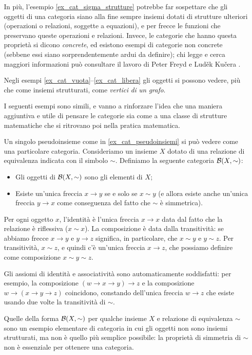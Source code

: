 In più, l'esempio \ref{ex_cat_sigma_strutture} potrebbe far sospettare che gli oggetti di una categoria siano alla fine sempre insiemi dotati di strutture ulteriori (operazioni o relazioni, soggette a equazioni), e per frecce le funzioni che preservano queste operazioni e relazioni. Invece, le categorie che hanno questa proprietà si dicono \emph{concrete}, ed esistono esempi di categorie non concrete (sebbene essi siano sorprendentemente ardui da definire); chi legge e cerca maggiori informazioni può consultare il lavoro di Peter Freyd e Lud\v{e}k Ku\v{c}era \cite{Freyd1973,Kuera1971}.

Negli esempi \ref{ex_cat_vuota}--\ref{ex_cat_libera} gli oggetti si possono vedere, più che come insiemi strutturati, come \emph{vertici di un grafo}.

I seguenti esempi sono simili, e vanno a rinforzare l'idea che una maniera aggiuntiva e utile di pensare le categorie sia come a una classe di strutture matematiche che si ritrovano poi nella pratica matematica.%
\begin{example}\label{ex_cat_rel_equiv}
 Un singolo pseudoinsieme come in \ref{ex_cat_pseudoinsiemi} si può vedere come una particolare categoria. Consideriamo un insieme \(X\) dotato di una relazione di equivalenza indicata con il simbolo \(\sim\).
 Definiamo la seguente categoria \(\mathcal{B}(X,\sim)\):
 \begin{itemize}
  \item Gli oggetti di \(\mathcal{B}(X,\sim)\) sono gli elementi di \(X\);
  \item Esiste un'unica freccia \(x\to y\) se e solo se \(x\sim y\) (e allora esiste anche un'unica freccia \(y\to x\) come conseguenza del fatto che \(\sim\) è simmetrica).
 \end{itemize}
 Per ogni oggetto \(x\), l'identità è l'unica freccia \(x\to x\) data dal fatto che la relazione è riflessiva (\(x\sim x\)).
 La composizione è data dalla transitività: se abbiamo frecce \(x\to y\) e \(y\to z\) significa, in particolare, che \(x\sim y\) e \(y\sim z\). Per transitività, \(x\sim z\), e quindi c'è un'unica freccia \(x\to z\), che possiamo definire come composizione \(x\sim y\sim z\).

 Gli assiomi di identità e associatività sono automaticamente soddisfatti: per esempio, la composizione \((w\to x\to y)\to z\) e la composizione \(w\to (x\to y\to z)\) coincidono, constando dell'unica freccia \(w\to z\) che esiste usando due volte la transitività di \(\sim\).
\end{example}
Quelle della forma \(\mathcal{B}(X,\sim)\) per qualche insieme \(X\) e relazione di equivalenza \(\sim\) sono un esempio elementare di categoria in cui gli oggetti non sono insiemi strutturati, ma non è quello più semplice possibile: la proprietà di simmetria di \(\sim\) non è essenziale per ottenere una categoria.

